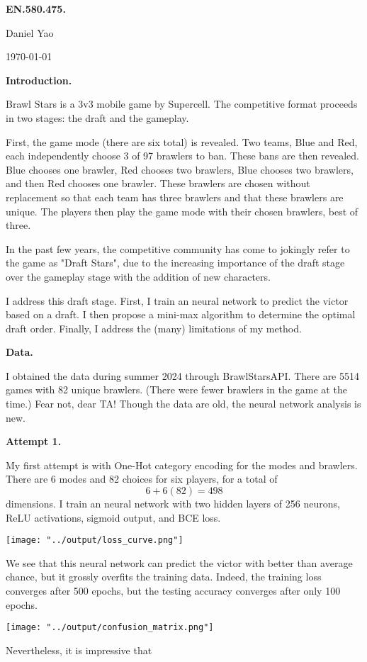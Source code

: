 \documentclass[12pt]{article}
\begin{document}
\textbf{EN.580.475.}

Daniel Yao

\today

\textbf{Introduction.}

Brawl Stars is a 3v3 mobile game by Supercell. The competitive format proceeds in two stages: the draft and the gameplay.

First, the game mode (there are six total) is revealed. Two teams, Blue and Red, each independently choose 3 of 97 brawlers to ban. These bans are then revealed. Blue chooses one brawler, Red chooses two brawlers, Blue chooses two brawlers, and then Red chooses one brawler. These brawlers are chosen without replacement so that each team has three brawlers and that these brawlers are unique. The players then play the game mode with their chosen brawlers, best of three.

In the past few years, the competitive community has come to jokingly refer to the game as "Draft Stars", due to the increasing importance of the draft stage over the gameplay stage with the addition of new characters.

I address this draft stage. First, I train an neural network to predict the victor based on a draft. I then propose a mini-max algorithm to determine the optimal draft order. Finally, I address the (many) limitations of my method.

\textbf{Data.}

I obtained the data during summer 2024 through BrawlStarsAPI. There are 5514 games with 82 unique brawlers. (There were fewer brawlers in the game at the time.) Fear not, dear TA! Though the data are old, the neural network analysis is new.

\textbf{Attempt 1.}

My first attempt is with One-Hot category encoding for the modes and brawlers. There are 6 modes and 82 choices for six players, for a total of 
$$6 + 6(82) = 498$$
dimensions. I train an neural network with two hidden layers of 256 neurons, ReLU activations, sigmoid output, and BCE loss.

\begin{center} \texttt{[image: "../output/loss\_curve.png"]} \end{center}

We see that this neural network can predict the victor with better than average chance, but it grossly overfits the training data. Indeed, the training loss converges after 500 epochs, but the testing accuracy converges after only 100 epochs.

\begin{center} \texttt{[image: "../output/confusion\_matrix.png"]} \end{center}

Nevertheless, it is impressive that 
\end{document}
